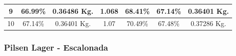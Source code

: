 \begin{longtable}{|p{1cm}|p{1.7cm}|p{2cm}|p{2cm}|p{2cm}| p{1cm}| p{1cm}|}
             \multicolumn{1}{|c|}{9} 
             & \multicolumn{1}{c|}{66.99\%}  
             & \multicolumn{1}{c|}{0.36486 Kg.} 
             & \multicolumn{1}{c|}{1.068}
             & \multicolumn{1}{c|}{68.41\%}
             & \multicolumn{1}{c|}{67.14\%} 
             & \multicolumn{1}{c|}{0.36401 Kg.} 
             \\
             \hline
             
             \multicolumn{1}{|c|}{10} 
             & \multicolumn{1}{c|}{67.14\%} 
             & \multicolumn{1}{c|}{0.36401 Kg.} 
             & \multicolumn{1}{c|}{1.07}
             & \multicolumn{1}{c|}{70.49\%}
             & \multicolumn{1}{c|}{67.48\%} 
             & \multicolumn{1}{c|}{0.37286 Kg.} 
             
             \\
             \hline
        
        \end{longtable}
        
    
 \subsubsection{Pilsen Lager - Escalonada}

